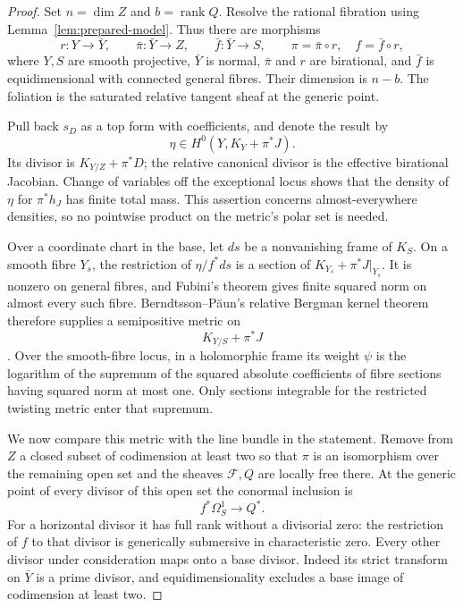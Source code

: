 \begin{proof}
Set $n=\dim Z$ and $b=\operatorname{rank}Q$.  Resolve the rational
fibration using Lemma~\ref{lem:prepared-model}.  Thus there are
morphisms
\[
 r:Y\longrightarrow\bar Y,\qquad
 \bar\pi:\bar Y\longrightarrow Z,\qquad
 \bar f:\bar Y\longrightarrow S,
 \qquad \pi=\bar\pi\circ r,\quad f=\bar f\circ r,
\]
where $Y,S$ are smooth projective, $\bar Y$ is normal, $\bar\pi$ and
$r$ are birational, and $\bar f$ is equidimensional with connected
general fibres.  Their dimension is $n-b$.  The foliation is the
saturated relative tangent sheaf at the generic point.

Pull back $s_D$ as a top form with coefficients, and denote the result
by
\[
               \eta\in H^0(Y,K_Y+\pi^*J).
\]
Its divisor is $K_{Y/Z}+\pi^*D$; the relative canonical divisor is the
effective birational Jacobian.  Change of variables off the exceptional
locus shows that the density of $\eta$ for $\pi^*h_J$ has finite total
mass.  This assertion concerns almost-everywhere densities, so no
pointwise product on the metric's polar set is needed.

Over a coordinate chart in the base, let $ds$ be a nonvanishing frame
of $K_S$.  On a smooth fibre $Y_s$, the restriction of
$\eta/f^*ds$ is a section of $K_{Y_s}+\pi^*J|_{Y_s}$.  It is nonzero
on general fibres, and Fubini's theorem gives finite squared norm on
almost every such fibre.  Berndtsson--P\u{a}un's relative Bergman
kernel theorem therefore supplies a semipositive metric on
\[
                       K_{Y/S}+\pi^*J
\]
\cite[Theorem~0.1]{BerndtssonPaun2008}.  Over the smooth-fibre locus, in a holomorphic frame its weight
$\psi$ is the logarithm of the supremum of the squared absolute
coefficients of fibre sections having squared norm at most one.
Only sections integrable for the restricted twisting metric enter
that supremum.

We now compare this metric with the line bundle in the statement.
Remove from $Z$ a closed subset of codimension at least two so that
$\pi$ is an isomorphism over the remaining open set and the sheaves
$\mathcal F,Q$ are locally free there.  At the generic point of every
divisor of this open set the conormal inclusion is
\[
                         f^*\Omega_S^1\longrightarrow Q^*.
\]
For a horizontal divisor it has full rank without a divisorial zero:
the restriction of $f$ to that divisor is generically submersive in
characteristic zero.  Every other divisor under consideration maps
onto a base divisor.  Indeed its strict transform on $\bar Y$ is a
prime divisor, and equidimensionality excludes a base image of
codimension at least two.


\end{proof}
